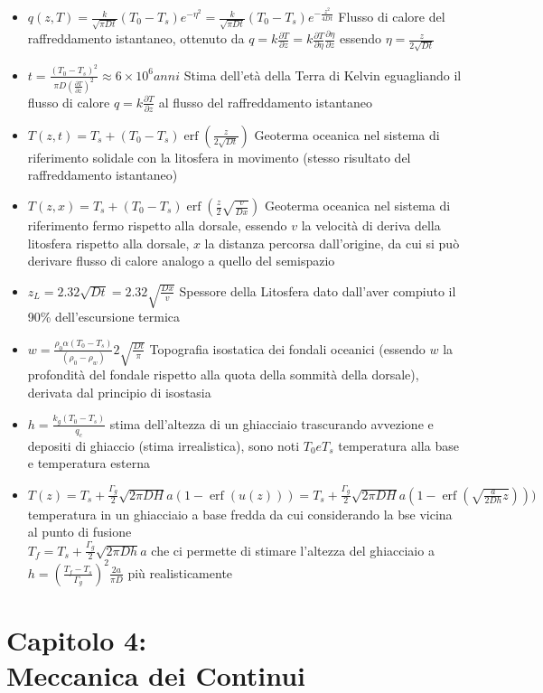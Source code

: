 \documentclass[a4paper]{article}
\DeclareMathOperator \erf{erf} %
\begin{document}
\begin{itemize}
	\item $q(z,T) = \frac{k}{\sqrt{\pi Dt}} (T_0-T_s) e^{-\eta^2} = \frac{k}{\sqrt{\pi Dt}} (T_0-T_s) e^{-\frac{z^2}{4Dt}}$ Flusso di calore del raffreddamento istantaneo, ottenuto da $q=k \frac{\partial T}{\partial z}= k\frac{\partial T}{\partial \eta} \frac{\partial \eta}{\partial z}$ essendo $\eta = \frac{z}{2 \sqrt{Dt}}$
	\item $t= \frac{(T_0-T_s)^2}{\pi D (\frac{\partial T}{\partial z})^2} \approx 6 \times 10^6 anni$ Stima dell'età della Terra di Kelvin eguagliando il flusso di calore $q=k\frac{\partial T}{\partial z}$ al flusso del raffreddamento istantaneo
	\item $T(z,t) = T_s + (T_0 - T_s) \erf(\frac{z}{2 \sqrt{Dt}})$ Geoterma oceanica nel sistema di riferimento solidale con la litosfera in movimento (stesso risultato del raffreddamento istantaneo)
	\item $T(z,x) = T_s + (T_0 - T_s) \erf(\frac{z}{2} \sqrt{\frac{v}{Dx}})$ Geoterma oceanica nel sistema di riferimento fermo rispetto alla dorsale, essendo $v$ la velocità di deriva della litosfera rispetto alla dorsale, $x$ la distanza percorsa dall'origine, da cui si può derivare flusso di calore analogo a quello del semispazio
	\item $z_L=2.32 \sqrt{Dt}=2.32 \sqrt{\frac{Dx}{v}}$ Spessore della Litosfera dato dall'aver compiuto il 90\% dell'escursione termica
	\item $ w = \frac{\rho_0 \alpha (T_0-T_s)}{(\rho_0-\rho_w)} 2 \sqrt{\frac{Dt}{\pi}}  $ Topografia isostatica dei fondali oceanici (essendo $w$ la profondità del fondale rispetto alla quota della sommità della dorsale), derivata dal principio di isostasia
	\item $h=\frac{k_g(T_0-T_s)}{q_c}$ stima dell'altezza di un ghiacciaio trascurando avvezione e depositi di ghiaccio (stima irrealistica), sono noti $T_0 e T_s$ temperatura alla base e temperatura esterna
	\item $T(z)=T_s+\frac{\Gamma_g}{2} \sqrt{2 \pi D H}{a}(1-\erf(u(z))) =T_s+\frac{\Gamma_g}{2} \sqrt{2 \pi D H}{a}(1-\erf(\sqrt{\frac{a}{2Dh}z})))$ temperatura in un ghiacciaio a base fredda da cui considerando la bse vicina al punto di fusione\\ $T_f=T_s+\frac{\Gamma_g}{2}\sqrt{2 \pi D h}{a}$ che ci permette di stimare l'altezza del ghiacciaio a $h=(\frac{T_f-T_s}{\Gamma_g})^2\frac{2a}{\pi D}$ più realisticamente
\end{itemize}

\section{Capitolo 4:\\ Meccanica dei Continui}
\end{document}
